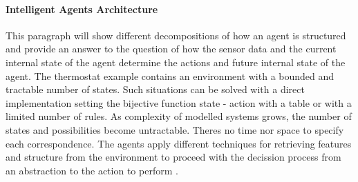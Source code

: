 \documentclass[11pt,oneside,a4paper,openright]{report}
\begin{document}

\paragraph{Intelligent Agents Architecture}

This paragraph will show different decompositions of how an agent is structured 
and provide an answer to the question of how the sensor data and the current internal 
state of the agent determine the actions and future internal state of the agent.
The thermostat example contains an environment with a bounded and tractable number of states.
Such situations can be solved with a direct implementation setting the bijective function 
state - action with a table or with a limited number of rules.
As complexity of modelled systems grows, the number of states and possibilities become
untractable. Theres no time nor space to specify each correspondence. The agents apply different 
techniques for retrieving features and structure from the environment to proceed with the
decission process from an abstraction to the action to perform \cite[ch.2]{RussellNorvig}.  
\end{document}
